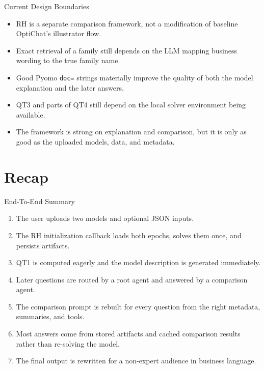 \documentclass[10pt]{beamer}
\newcommand{\func}[1]{\texttt{#1}}
\begin{document}
\begin{frame}{Current Design Boundaries}
  \begin{itemize}
    \item RH is a separate comparison framework, not a modification of baseline OptiChat's illustrator flow.
    \item Exact retrieval of a family still depends on the LLM mapping business wording to the true family name.
    \item Good Pyomo \func{doc=} strings materially improve the quality of both the model explanation and the later answers.
    \item QT3 and parts of QT4 still depend on the local solver environment being available.
    \item The framework is strong on explanation and comparison, but it is only as good as the uploaded models, data, and metadata.
  \end{itemize}
\end{frame}

\section{Recap}

\begin{frame}{End-To-End Summary}
  \begin{enumerate}
    \item The user uploads two models and optional JSON inputs.
    \item The RH initialization callback loads both epochs, solves them once, and persists artifacts.
    \item QT1 is computed eagerly and the model description is generated immediately.
    \item Later questions are routed by a root agent and answered by a comparison agent.
    \item The comparison prompt is rebuilt for every question from the right metadata, summaries, and tools.
    \item Most answers come from stored artifacts and cached comparison results rather than re-solving the model.
    \item The final output is rewritten for a non-expert audience in business language.
  \end{enumerate}
\end{frame}
\end{document}
